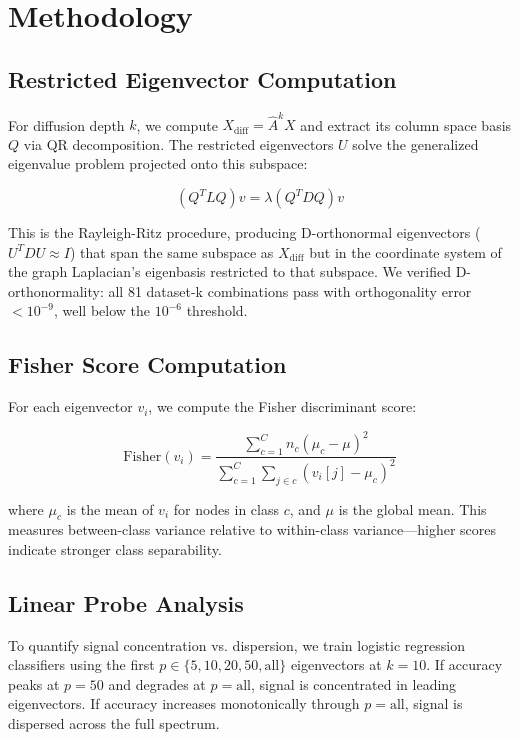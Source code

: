 \documentclass[11pt]{article}
\begin{document}
\section{Methodology}

\subsection{Restricted Eigenvector Computation}

For diffusion depth $k$, we compute $X_{\text{diff}} = \hat{A}^k X$ and extract its column space basis $Q$ via QR decomposition. The restricted eigenvectors $U$ solve the generalized eigenvalue problem projected onto this subspace:

\begin{equation}
(Q^T L Q) v = \lambda (Q^T D Q) v
\end{equation}

This is the Rayleigh-Ritz procedure, producing D-orthonormal eigenvectors ($U^T D U \approx I$) that span the same subspace as $X_{\text{diff}}$ but in the coordinate system of the graph Laplacian's eigenbasis restricted to that subspace. We verified D-orthonormality: all 81 dataset-k combinations pass with orthogonality error $< 10^{-9}$, well below the $10^{-6}$ threshold.

\subsection{Fisher Score Computation}

For each eigenvector $v_i$, we compute the Fisher discriminant score:

\begin{equation}
\text{Fisher}(v_i) = \frac{\sum_{c=1}^C n_c (\mu_c - \mu)^2}{\sum_{c=1}^C \sum_{j \in c} (v_i[j] - \mu_c)^2}
\end{equation}

where $\mu_c$ is the mean of $v_i$ for nodes in class $c$, and $\mu$ is the global mean. This measures between-class variance relative to within-class variance—higher scores indicate stronger class separability.

\subsection{Linear Probe Analysis}

To quantify signal concentration vs. dispersion, we train logistic regression classifiers using the first $p \in \{5, 10, 20, 50, \text{all}\}$ eigenvectors at $k{=}10$. If accuracy peaks at $p{=}50$ and degrades at $p{=}\text{all}$, signal is concentrated in leading eigenvectors. If accuracy increases monotonically through $p{=}\text{all}$, signal is dispersed across the full spectrum.
\end{document}
